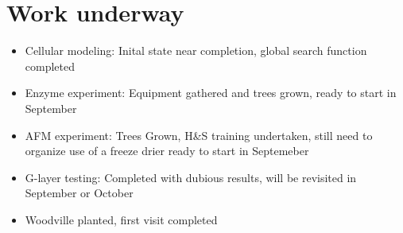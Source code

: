 \section{Work underway}
\begin{itemize}
\item Cellular modeling:
Inital state near completion, global search function completed
\end{itemize}

\begin{itemize}
\item Enzyme experiment: 
Equipment gathered and trees grown, ready to start in September
\end{itemize}
\begin{itemize}
\item AFM experiment:
Trees Grown, H&S training undertaken, still need to organize use of a freeze drier
ready to start in Septemeber
\end{itemize}
\begin{itemize}
\item G-layer testing:
Completed with dubious results, will be revisited in September or October
\end{itemize}
\begin{itemize}
\item Woodville planted, first visit completed
\end{itemize}
  
  
  
  
  